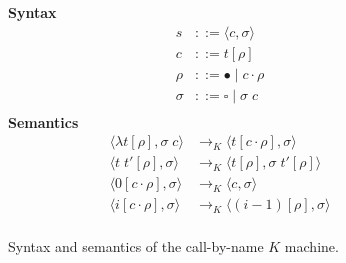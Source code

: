 \begin{figure}
\textbf{Syntax}
\begin{align*}
\tag{State} s &::= \langle c, \sigma \rangle \\
\tag{Closure} c &::= t [\rho] \\
\tag{Environment} \rho &::= \bullet \; | \; c \cdot \rho \\
\tag{Context} \sigma &::= \square \; | \; \sigma \; c  \\
\end{align*}
\textbf{Semantics}
\begin{align*}
\tag{Lam}
\langle \lambda t[\rho], \sigma \; c \rangle 
  &\rightarrow_{K}
\langle t[c \cdot \rho], \sigma \rangle  \\
\tag{App}
\langle t \; t'[\rho], \sigma \rangle
  &\rightarrow_{K}
\langle t[\rho], \sigma \; t'[\rho] \rangle \\
\tag{Var1}
\langle 0[c \cdot \rho ], \sigma  \rangle
  &\rightarrow_{K}
\langle c, \sigma \rangle  \\
\tag{Var2}
\langle i[c \cdot \rho], \sigma \rangle
  &\rightarrow_{K}
\langle (i-1)[\rho], \sigma \rangle \\
\end{align*}
\caption{Syntax and semantics of the call-by-name $K$ machine.}
\label{fig:Krivine}
\end{figure}
